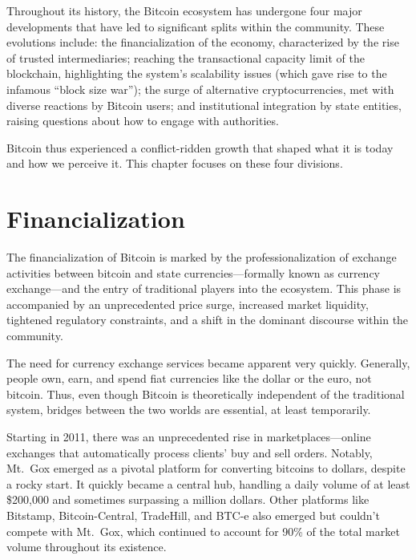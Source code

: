 \documentclass[
  a5paper,
  smalldemyvopaper,10pt,twoside,onecolumn,openright,extrafontsizes,hidelinks]{memoir}
\begin{document}
Throughout its history, the Bitcoin ecosystem has undergone four major
developments that have led to significant splits within the community.
These evolutions include: the financialization of the economy,
characterized by the rise of trusted intermediaries; reaching the
transactional capacity limit of the blockchain, highlighting the
system's scalability issues (which gave rise to the infamous ``block
size war''); the surge of alternative cryptocurrencies, met with diverse
reactions by Bitcoin users; and institutional integration by state
entities, raising questions about how to engage with authorities.

Bitcoin thus experienced a conflict-ridden growth that shaped what it is
today and how we perceive it. This chapter focuses on these four
divisions.

\section*{Financialization}\label{la-financiarisation}


The financialization of Bitcoin is marked by the professionalization of
exchange activities between bitcoin and state currencies---formally
known as currency exchange---and the entry of traditional players into
the ecosystem. This phase is accompanied by an unprecedented price
surge, increased market liquidity, tightened regulatory constraints, and
a shift in the dominant discourse within the community.

The need for currency exchange services became apparent very quickly.
Generally, people own, earn, and spend fiat currencies like the dollar
or the euro, not bitcoin. Thus, even though Bitcoin is theoretically
independent of the traditional system, bridges between the two worlds
are essential, at least temporarily.

Starting in 2011, there was an unprecedented rise in
marketplaces---online exchanges that automatically process clients' buy
and sell orders. Notably, Mt.~Gox emerged as a pivotal platform for
converting bitcoins to dollars, despite a rocky start. It quickly became
a central hub, handling a daily volume of at least \$200,000 and
sometimes surpassing a million dollars. Other platforms like Bitstamp,
Bitcoin-Central, TradeHill, and BTC-e also emerged but couldn't compete
with Mt.~Gox, which continued to account for 90\% of the total market
volume throughout its existence.
\end{document}
